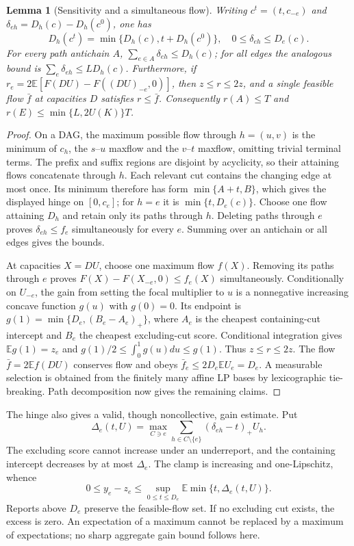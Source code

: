\documentclass[11pt]{article}
\newtheorem{lemma}[theorem]{Lemma}
\theoremstyle{definition}\newtheorem{definition}[theorem]{Definition}
\theoremstyle{remark}\newtheorem{remark}[theorem]{Remark}
\newcommand{\E}{\mathbb E}
\begin{document}
\begin{lemma}[Sensitivity and a simultaneous flow]\label{noise:sensitivity}
Writing $c^t=(t,c_{-e})$ and $\delta_{eh}=D_h(c)-D_h(c^0)$, one has
\[
 D_h(c^t)=\min\{D_h(c),t+D_h(c^0)\},\quad
 0\le\delta_{eh}\le D_e(c).
\]
For every path antichain $A$, $\sum_{e\in A}\delta_{eh}\le D_h(c)$;
for all edges the analogous bound is $\sum_e\delta_{eh}\le LD_h(c)$.
Furthermore, if
$r_e=2\E[F(DU)-F((DU)_{-e},0)]$, then
$z\le r\le2z$, and a single feasible flow $\bar f$ at capacities $D$
satisfies $r\le\bar f$. Consequently $r(A)\le T$ and
$r(E)\le\min\{L,2U(K)\}T$.
\end{lemma}
\begin{proof}
On a DAG, the maximum possible flow through $h=(u,v)$ is the minimum of
$c_h$, the $s$--$u$ maxflow and the $v$--$t$ maxflow, omitting trivial
terminal terms. The prefix and suffix regions are disjoint by acyclicity,
so their attaining flows concatenate through $h$. Each relevant cut
contains the changing edge at most once. Its minimum therefore has form
$\min\{A+t,B\}$, which gives the displayed hinge on $[0,c_e]$;
for $h=e$ it is $\min\{t,D_e(c)\}$.
Choose one flow attaining $D_h$ and retain only its paths through $h$.
Deleting paths through $e$ proves $\delta_{eh}\le f_e$ simultaneously
for every $e$. Summing over an antichain or all edges gives the bounds.

At capacities $X=DU$, choose one maximum flow $f(X)$. Removing its paths
through $e$ proves $F(X)-F(X_{-e},0)\le f_e(X)$ simultaneously.
Conditionally on $U_{-e}$, the gain from setting the focal multiplier to
$u$ is a nonnegative increasing concave function $g(u)$ with $g(0)=0$.
Its endpoint is $g(1)=\min\{D_e,(B_e-A_e)_+\}$, where $A_e$ is the
cheapest containing-cut intercept and $B_e$ the cheapest excluding-cut
score. Conditional integration gives $\E g(1)=z_e$ and
$g(1)/2\le\int_0^1g(u)du\le g(1)$. Thus $z\le r\le2z$.
The flow $\bar f=2\E f(DU)$ conserves flow and obeys
$\bar f_e\le2D_e\E U_e=D_e$. A measurable selection is obtained from
the finitely many affine LP bases by lexicographic tie-breaking.
Path decomposition now gives the remaining claims.
\end{proof}
The hinge also gives a valid, though noncollective, gain estimate. Put
\[
 \Delta_e(t,U)=\max_{C\ni e}\sum_{h\in C\setminus\{e\}}
                         (\delta_{eh}-t)_+U_h.
\]
The excluding score cannot increase under an underreport, and the containing
intercept decreases by at most $\Delta_e$. The clamp is increasing and
one-Lipschitz, whence
\[
 0\le y_e-z_e\le\sup_{0\le t\le D_e}\E\min\{t,\Delta_e(t,U)\}.
\]
Reports above $D_e$ preserve the feasible-flow set. If no excluding cut
exists, the excess is zero. An expectation of a maximum cannot be replaced
by a maximum of expectations; no sharp aggregate gain bound follows here.
\end{document}
